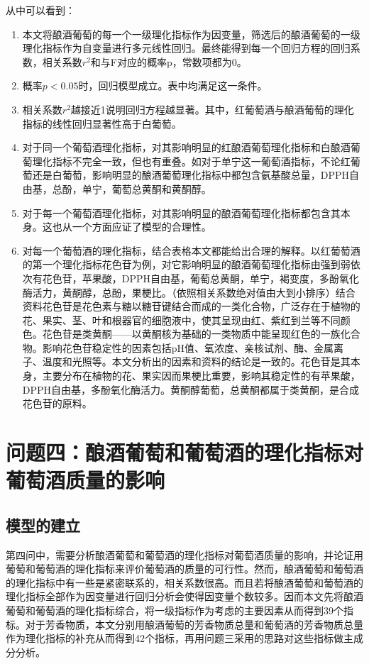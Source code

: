 \documentclass[withoutpreface,bwprint]{cumcmthesis} %
\begin{document}
从中可以看到：
\begin{enumerate}
	\item 本文将酿酒葡萄的每一个一级理化指标作为因变量，筛选后的酿酒葡萄的一级理化指标作为自变量进行多元线性回归。最终能得到每一个回归方程的回归系数，相关系数$r^2$和与F对应的概率p，常数项都为0。
	\item 概率$p<0.05$时，回归模型成立。表中均满足这一条件。
	\item 相关系数$r^2$越接近1说明回归方程越显著。其中，红葡萄酒与酿酒葡萄的理化指标的线性回归显著性高于白葡萄。
	\item 对于同一个葡萄酒理化指标，对其影响明显的红酿酒葡萄理化指标和白酿酒葡萄理化指标不完全一致，但也有重叠。如对于单宁这一葡萄酒指标，不论红葡萄还是白葡萄，影响明显的酿酒葡萄理化指标中都包含氨基酸总量，DPPH自由基，总酚，单宁，葡萄总黄酮和黄酮醇。
	\item 对于每一个葡萄酒理化指标，对其影响明显的酿酒葡萄理化指标都包含其本身。这也从一个方面应证了模型的合理性。
	\item 对每一个葡萄酒的理化指标，结合表格本文都能给出合理的解释。以红葡萄酒的第一个理化指标花色苷为例，对它影响明显的酿酒葡萄理化指标由强到弱依次有花色苷，苹果酸，DPPH自由基，葡萄总黄酮，单宁，褐变度，多酚氧化酶活力，黄酮醇，总酚，果梗比。（依照相关系数绝对值由大到小排序）结合资料花色苷是花色素与糖以糖苷键结合而成的一类化合物，广泛存在于植物的花、果实、茎、叶和根器官的细胞液中，使其呈现由红、紫红到兰等不同颜色。花色苷是类黄酮——以黄酮核为基础的一类物质中能呈现红色的一族化合物。影响花色苷稳定性的因素包括pH值、氧浓度、亲核试剂、酶、金属离子、温度和光照等。本文分析出的因素和资料的结论是一致的。花色苷是其本身，主要分布在植物的花、果实因而果梗比重要，影响其稳定性的有苹果酸，DPPH自由基，多酚氧化酶活力。黄酮醇葡萄，总黄酮都属于类黄酮，是合成花色苷的原料。
\end{enumerate}
\newpage
\section{问题四：酿酒葡萄和葡萄酒的理化指标对葡萄酒质量的影响}
\subsection{模型的建立}

\par 第四问中，需要分析酿酒葡萄和葡萄酒的理化指标对葡萄酒质量的影响，并论证用葡萄和葡萄酒的理化指标来评价葡萄酒的质量的可行性。然而，酿酒葡萄和葡萄酒的理化指标中有一些是紧密联系的，相关系数很高。而且若将酿酒葡萄和葡萄酒的理化指标全部作为因变量进行回归分析会使得因变量个数较多。因而本文先将酿酒葡萄和葡萄酒的理化指标综合，将一级指标作为考虑的主要因素从而得到39个指标。对于芳香物质，本文分别用酿酒葡萄的芳香物质总量和葡萄酒的芳香物质总量作为理化指标的补充从而得到42个指标，再用问题三采用的思路对这些指标做主成分分析。
\end{document}
